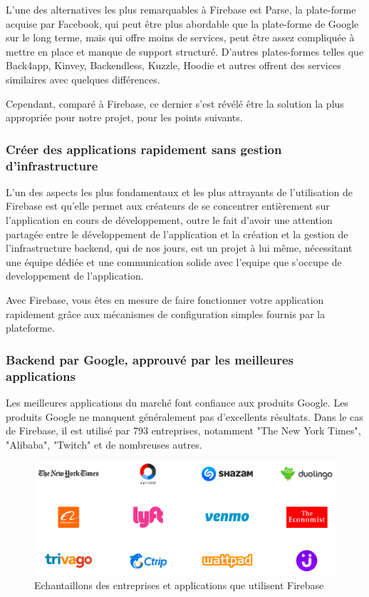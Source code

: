 L’une des alternatives les plus remarquables à Firebase est Parse, la plate-forme acquise par Facebook, qui peut être plus abordable que la plate-forme de Google sur le long terme, mais qui offre moins de services, peut être assez compliquée à mettre en place et manque de support structuré. D'autres plates-formes telles que Back4app, Kinvey, Backendless, Kuzzle, Hoodie et autres offrent des services similaires avec quelques différences.

Cependant, comparé à Firebase, ce dernier s’est révélé être la solution la plus appropriée pour notre projet, pour les points suivants.

\subsubsection{Créer des applications rapidement sans gestion d'infrastructure}
L’un des aspects les plus fondamentaux et les plus attrayants de l’utilisation de Firebase est qu’elle permet aux créateurs de se concentrer entièrement sur l’application en cours de développement, outre le fait d’avoir une attention partagée entre le développement de l’application et la création et la gestion de l’infrastructure backend, qui de nos jours, est un projet à lui même, nécessitant une équipe dédiée et une communication solide avec l'equipe que s'occupe de developpement de l'application.

Avec Firebase, vous êtes en mesure de faire fonctionner votre application rapidement grâce aux mécanismes de configuration simples fournis par la plateforme.

\subsubsection{Backend par Google, approuvé par les meilleures applications}
Les meilleures applications du marché font confiance aux produits Google. Les produits Google ne manquent généralement pas d'excellents résultats. Dans le cas de Firebase, il est utilisé par 793 entreprises\cite{noauthor_companies_nodate}, notamment "The New York Times", "Alibaba", "Twitch" et de nombreuses autres.\bigskip

\begin{figure}[h]
	\begin{center}
		\includegraphics[width=13cm]{Images/chapter2/trusting_apps.png}
		\caption{{\footnotesize Echantaillons des entreprises et applications que utilisent Firebase}}
	\end{center}
\end{figure}

